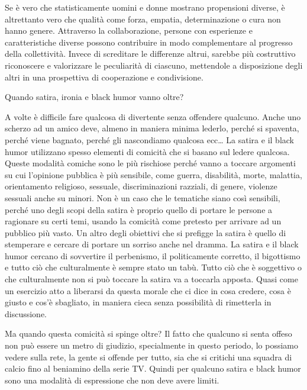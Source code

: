 \documentclass[12pt]{book} %
\begin{document}
Se è vero che statisticamente uomini e donne mostrano propensioni diverse, è altrettanto vero che qualità come forza, empatia, determinazione o cura non hanno genere. Attraverso la collaborazione, persone con esperienze e caratteristiche diverse possono contribuire in modo complementare al progresso della collettività. Invece di screditare le differenze altrui, sarebbe più costruttivo riconoscere e valorizzare le peculiarità di ciascuno, mettendole a disposizione degli altri in una prospettiva di cooperazione e condivisione.

\begin{mdframed}[linewidth=1pt]
Quando satira, ironia e black humor vanno oltre?

A volte è difficile fare qualcosa di divertente senza offendere qualcuno. Anche uno scherzo ad un amico deve, almeno
in maniera minima lederlo, perché si spaventa, perché viene bagnato, perché gli nascondiamo qualcosa ecc… La satira e
il black humor utilizzano spesso elementi di comicità che si basano sul ledere qualcosa. Queste modalità comiche sono
le più rischiose perché vanno a toccare argomenti su cui l'opinione pubblica è più sensibile, come
guerra, disabilità, morte, malattia, orientamento religioso, sessuale, discriminazioni razziali, di genere, violenze
sessuali anche su minori. Non è un caso che le tematiche siano così sensibili, perché uno degli scopi della satira è
proprio quello di portare le persone a ragionare su certi temi, usando la comicità come pretesto per arrivare ad un
pubblico più vasto. Un altro degli obiettivi che si prefigge la satira è quello di stemperare e cercare di portare un
sorriso anche nel dramma. La satira e il black humor cercano di sovvertire il perbenismo, il politicamente corretto, il
bigottismo e tutto ciò che culturalmente è sempre stato un tabù. Tutto ciò che è soggettivo o che culturalmente non si
può toccare la satira va a toccarla apposta. Quasi come un esercizio atto a liberarsi da questa morale che ci dice in
cosa credere, cosa è giusto e cos'è sbagliato, in maniera cieca senza possibilità di rimetterla in discussione. 

Ma quando questa comicità si spinge oltre? Il fatto che qualcuno si senta offeso non può essere un metro di giudizio,
specialmente in questo periodo, lo possiamo vedere sulla rete, la gente si offende per tutto, sia che si critichi una
squadra di calcio fino al beniamino della serie TV. Quindi per qualcuno satira e black humor sono una modalità di
espressione che non deve avere limiti.


\end{mdframed}
\end{document}
